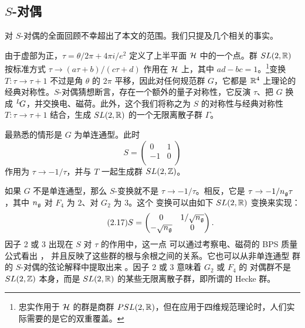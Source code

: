 
\subsection{$S$-对偶}

\label{sec:reviewsd}

对 $S$-对偶的全面回顾不幸超出了本文的范围。我们只提及几个相关的事实。

由于虚部为正，$\tau=\theta/2\pi +4\pi i/e^2$ 定义了上半平面 ${\EUH}$ 中的一个点。群
$SL(2,\Bbb{R})$ 按标准方式 $\tau\to (a\tau+b)/(c\tau+d)$ 作用在 ${\EUH}$ 上，其中 $ad-bc=1$。\footnote{忠实作用于 ${\EUH}$ 的群是商群 $PSL(2,\Bbb{R})$，但在应用于四维规范理论时，人们实际需要的是它的双重覆盖。}变换 $T:\tau\to\tau+1$ 不过是角 $\theta$ 的 $2\pi$ 平移，因此对任何规范群 $G$，它都是 $\Bbb{R}^4$ 上理论的经典对称性。$S$-对偶猜想断言，存在一个额外的量子对称性，它反演 $\tau$、把 $G$ 换成 $^L\negthinspace G$，并交换电、磁荷。此外，这个我们将称之为 $S$ 的对称性与经典对称性 $T:\tau\to\tau+1$ 结合，生成 $SL(2,\Bbb{R})$ 的一个无限离散子群 $\Gamma$。

最熟悉的情形是 $G$ 为单连通型。此时
\setcounter{equation}{15}
\begin{equation}\label{eq:bivolo}
S=\left(\begin{matrix} 0 & 1\\ -1 & 0\\\end{matrix}\right)
\end{equation}
作用为 $\tau\to -1/\tau$，并与 $T$ 一起生成群
$SL(2,\Bbb{Z})$。

如果 $G$ 不是单连通型，那么 $S$-变换就不是 $\tau\to -1/\tau$。相反，它是
$\tau\to -1/n_{\frak g}\tau$，其中 $n_{\frak g}$ 对 $F_4$ 为 $2$、对 $G_2$ 为 3。这个
变换可以由如下 $SL(2,\Bbb{R})$ 变换来实现：
\begin{equation*}
\tag*{(2.17)}
S=\left(\begin{matrix} 0 & 1/\sqrt {n_{\frak
g}}\\ -\sqrt {n_{\frak g}} & 0\\\end{matrix}\right).
\end{equation*}
因子 2 或 3 出现在 $S$ 对 $\tau$ 的作用中，这一点
可以通过考察电、磁荷的 BPS 质量公式看出 \cite{ref46,ref47}，
并且反映了这些群的根与余根之间的关系。它也可以从非单连通型
群的 $S$-对偶的弦论解释中提取出来 \cite{ref48}。因子 2 或 3 意味着 $G_2$ 或 $F_4$ 的
对偶群不是 $SL(2,\Bbb{Z})$ 本身，而是 $SL(2,\Bbb{R})$ 的某些无限离散子群，即所谓的 Hecke 群。

